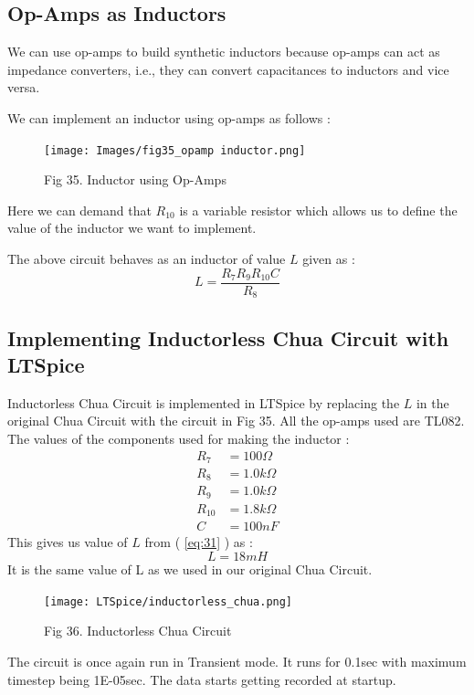 \documentclass[12pt]{article}
\newcommand*{\myref}[1]{%
  \begingroup
    \hypersetup{
      linkcolor=linkequation,
      linkbordercolor=linkequation,
    }%
    \ref{#1}%
  \endgroup
}
\begin{document}
\subsection{Op-Amps as Inductors}
We can use op-amps to build synthetic inductors because op-amps can act as impedance converters, i.e., they can convert capacitances to inductors and vice versa. \linebreak

We can implement an inductor using op-amps as follows :
\begin{figure}[H]
	\centering
	\texttt{[image: Images/fig35\_opamp inductor.png]}
	\caption{Fig 35. Inductor using Op-Amps}
\end{figure}
Here we can demand that $R_{10}$ is a variable resistor which allows us to define the value of the inductor we want to implement. \linebreak

The above circuit behaves as an inductor of value $L$ given as :
\begin{equation}
	L=\dfrac{R_7 R_9 R_{10} C}{R_8} \label{eq:31}
\end{equation}
\subsection{Implementing Inductorless Chua Circuit with LTSpice}
Inductorless Chua Circuit is implemented in LTSpice by replacing the $L$ in the original Chua Circuit with the circuit in Fig 35. \linebreak
All the op-amps used are TL082. \linebreak
The values of the components used for making the inductor :
\begin{align*}
	R_7&= 100\Omega \\
	R_8&=1.0k\Omega \\
	R_9&=1.0k\Omega \\
	R_{10}&=1.8k\Omega \\
	C&=100nF
\end{align*}
This gives us value of $L$ from (\myref{eq:31}) as :
\[ L=18mH \]
It is the same value of L as we used in our original Chua Circuit. 
\begin{figure}[H]
	\centering
	\texttt{[image: LTSpice/inductorless\_chua.png]}
	\caption{Fig 36. Inductorless Chua Circuit}
\end{figure}
The circuit is once again run in Transient mode. It runs for 0.1sec with maximum timestep being 1E-05sec. The data starts getting recorded at startup. \linebreak
\end{document}
